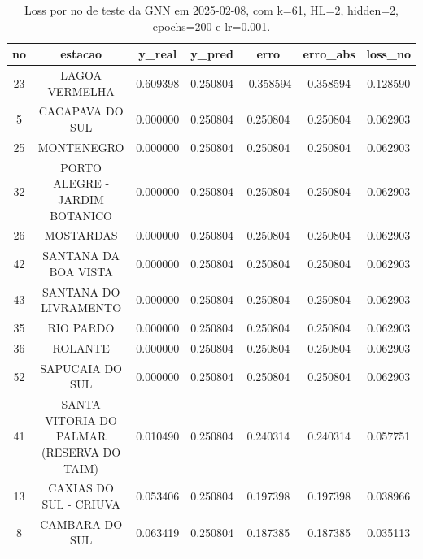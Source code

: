 \begin{table}[h]
\centering
\caption{Loss por no de teste da GNN em 2025-02-08, com k=61, HL=2, hidden=2, epochs=200 e lr=0.001.}
\label{tab:gnn_loss_k61_hl2_h2_e200_d20250208}
\begin{tabular}{ccccccc}
\toprule
no & estacao & y\_real & y\_pred & erro & erro\_abs & loss\_no \\
\midrule
23 & LAGOA VERMELHA & 0.609398 & 0.250804 & -0.358594 & 0.358594 & 0.128590 \\
5 & CACAPAVA DO SUL & 0.000000 & 0.250804 & 0.250804 & 0.250804 & 0.062903 \\
25 & MONTENEGRO & 0.000000 & 0.250804 & 0.250804 & 0.250804 & 0.062903 \\
32 & PORTO ALEGRE - JARDIM BOTANICO & 0.000000 & 0.250804 & 0.250804 & 0.250804 & 0.062903 \\
26 & MOSTARDAS & 0.000000 & 0.250804 & 0.250804 & 0.250804 & 0.062903 \\
42 & SANTANA DA BOA VISTA & 0.000000 & 0.250804 & 0.250804 & 0.250804 & 0.062903 \\
43 & SANTANA DO LIVRAMENTO & 0.000000 & 0.250804 & 0.250804 & 0.250804 & 0.062903 \\
35 & RIO PARDO & 0.000000 & 0.250804 & 0.250804 & 0.250804 & 0.062903 \\
36 & ROLANTE & 0.000000 & 0.250804 & 0.250804 & 0.250804 & 0.062903 \\
52 & SAPUCAIA DO SUL & 0.000000 & 0.250804 & 0.250804 & 0.250804 & 0.062903 \\
41 & SANTA VITORIA DO PALMAR (RESERVA DO TAIM) & 0.010490 & 0.250804 & 0.240314 & 0.240314 & 0.057751 \\
13 & CAXIAS DO SUL - CRIUVA & 0.053406 & 0.250804 & 0.197398 & 0.197398 & 0.038966 \\
8 & CAMBARA DO SUL & 0.063419 & 0.250804 & 0.187385 & 0.187385 & 0.035113 \\
\bottomrule
\end{tabular}
\end{table}
